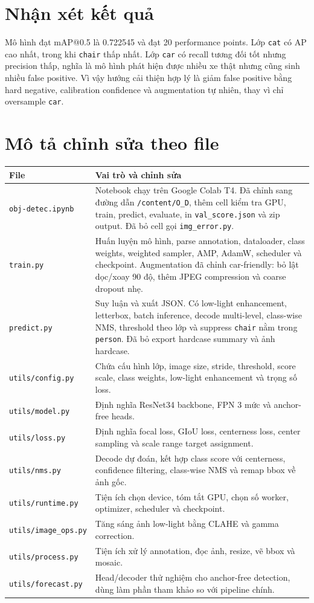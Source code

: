 \documentclass[12pt,a4paper]{article}
\begin{document}
\section{Nhận xét kết quả}

Mô hình đạt mAP@0.5 là 0.722545 và đạt 20 performance points. Lớp \texttt{cat} có AP cao nhất, trong khi \texttt{chair} thấp nhất. Lớp \texttt{car} có recall tương đối tốt nhưng precision thấp, nghĩa là mô hình phát hiện được nhiều xe thật nhưng cũng sinh nhiều false positive. Vì vậy hướng cải thiện hợp lý là giảm false positive bằng hard negative, calibration confidence và augmentation tự nhiên, thay vì chỉ oversample \texttt{car}.

\section{Mô tả chỉnh sửa theo file}

\begin{longtable}{p{}p{}}
\toprule
File & Vai trò và chỉnh sửa \\
\midrule
\texttt{obj-detec.ipynb} & Notebook chạy trên Google Colab T4. Đã chỉnh sang đường dẫn \texttt{/content/O\_D}, thêm cell kiểm tra GPU, train, predict, evaluate, in \texttt{val\_score.json} và zip output. Đã bỏ cell gọi \texttt{img\_error.py}. \\
\texttt{train.py} & Huấn luyện mô hình, parse annotation, dataloader, class weights, weighted sampler, AMP, AdamW, scheduler và checkpoint. Augmentation đã chỉnh car-friendly: bỏ lật dọc/xoay 90 độ, thêm JPEG compression và coarse dropout nhẹ. \\
\texttt{predict.py} & Suy luận và xuất JSON. Có low-light enhancement, letterbox, batch inference, decode multi-level, class-wise NMS, threshold theo lớp và suppress \texttt{chair} nằm trong \texttt{person}. Đã bỏ export hardcase summary và ảnh hardcase. \\
\texttt{utils/config.py} & Chứa cấu hình lớp, image size, stride, threshold, score scale, class weights, low-light enhancement và trọng số loss. \\
\texttt{utils/model.py} & Định nghĩa ResNet34 backbone, FPN 3 mức và anchor-free heads. \\
\texttt{utils/loss.py} & Định nghĩa focal loss, GIoU loss, centerness loss, center sampling và scale range target assignment. \\
\texttt{utils/nms.py} & Decode dự đoán, kết hợp class score với centerness, confidence filtering, class-wise NMS và remap bbox về ảnh gốc. \\
\texttt{utils/runtime.py} & Tiện ích chọn device, tóm tắt GPU, chọn số worker, optimizer, scheduler và checkpoint. \\
\texttt{utils/image\_ops.py} & Tăng sáng ảnh low-light bằng CLAHE và gamma correction. \\
\texttt{utils/process.py} & Tiện ích xử lý annotation, đọc ảnh, resize, vẽ bbox và mosaic. \\
\texttt{utils/forecast.py} & Head/decoder thử nghiệm cho anchor-free detection, dùng làm phần tham khảo so với pipeline chính. \\
\bottomrule
\end{longtable}
\end{document}
